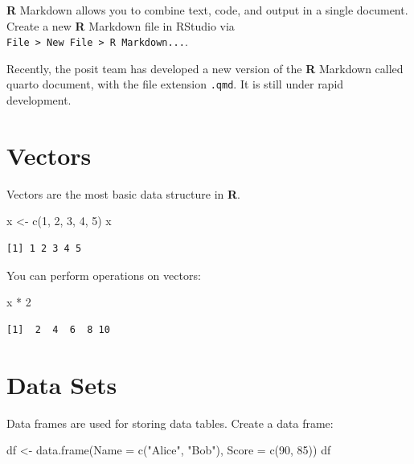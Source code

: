 \documentclass[
  letterpaper,
  DIV=11,
  numbers=noendperiod]{scrreprt}
\newenvironment{Shaded}{\begin{snugshade}}{\end{snugshade}}
\newcommand{\AttributeTok}[1]{\textcolor[rgb]{0.40,0.45,0.13}{#1}}
\newcommand{\DecValTok}[1]{\textcolor[rgb]{0.68,0.00,0.00}{#1}}
\newcommand{\FunctionTok}[1]{\textcolor[rgb]{0.28,0.35,0.67}{#1}}
\newcommand{\NormalTok}[1]{\textcolor[rgb]{0.00,0.23,0.31}{#1}}
\newcommand{\OtherTok}[1]{\textcolor[rgb]{0.00,0.23,0.31}{#1}}
\newcommand{\SpecialCharTok}[1]{\textcolor[rgb]{0.37,0.37,0.37}{#1}}
\newcommand{\StringTok}[1]{\textcolor[rgb]{0.13,0.47,0.30}{#1}}
\begin{document}
\textbf{R} Markdown allows you to combine text, code, and output in a
single document. Create a new \textbf{R} Markdown file in RStudio via
\texttt{File\ \textgreater{}\ New\ File\ \textgreater{}\ R\ Markdown...}.

Recently, the posit team has developed a new version of the \textbf{R}
Markdown called quarto document, with the file extension \texttt{.qmd}.
It is still under rapid development.

\section{Vectors}\label{vectors}

Vectors are the most basic data structure in \textbf{R}.

\begin{Shaded}
\begin{Highlighting}[]
\NormalTok{x }\OtherTok{\textless{}{-}} \FunctionTok{c}\NormalTok{(}\DecValTok{1}\NormalTok{, }\DecValTok{2}\NormalTok{, }\DecValTok{3}\NormalTok{, }\DecValTok{4}\NormalTok{, }\DecValTok{5}\NormalTok{)}
\NormalTok{x}
\end{Highlighting}
\end{Shaded}

\begin{verbatim}
[1] 1 2 3 4 5
\end{verbatim}

You can perform operations on vectors:

\begin{Shaded}
\begin{Highlighting}[]
\NormalTok{x }\SpecialCharTok{*} \DecValTok{2}
\end{Highlighting}
\end{Shaded}

\begin{verbatim}
[1]  2  4  6  8 10
\end{verbatim}

\section{Data Sets}\label{data-sets}

Data frames are used for storing data tables. Create a data frame:

\begin{Shaded}
\begin{Highlighting}[]
\NormalTok{df }\OtherTok{\textless{}{-}} \FunctionTok{data.frame}\NormalTok{(}\AttributeTok{Name =} \FunctionTok{c}\NormalTok{(}\StringTok{"Alice"}\NormalTok{, }\StringTok{"Bob"}\NormalTok{), }\AttributeTok{Score =} \FunctionTok{c}\NormalTok{(}\DecValTok{90}\NormalTok{, }\DecValTok{85}\NormalTok{))}
\NormalTok{df}
\end{Highlighting}
\end{Shaded}
\end{document}
